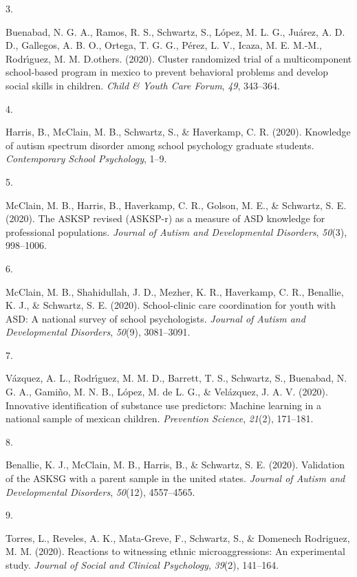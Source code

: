 \documentclass[11pt,a4paper,]{moderncv}
\newlength{\csllabelwidth}
\newcommand{\CSLLeftMargin}[1]{\parbox[t]{\csllabelwidth}{#1}}
\newcommand{\CSLRightInline}[1]{\parbox[t]{\linewidth - \csllabelwidth}{#1}}
\begin{document}
\leavevmode{}%
\CSLLeftMargin{3. }
\CSLRightInline{Buenabad, N. G. A., Ramos, R. S., Schwartz, S., López,
M. L. G., Juárez, A. D. D., Gallegos, A. B. O., Ortega, T. G. G., Pérez,
L. V., Icaza, M. E. M.-M., Rodrı́guez, M. M. D.others. (2020). Cluster
randomized trial of a multicomponent school-based program in mexico to
prevent behavioral problems and develop social skills in children.
\emph{Child \& Youth Care Forum}, \emph{49}, 343--364.}

\leavevmode{}%
\CSLLeftMargin{4. }
\CSLRightInline{Harris, B., McClain, M. B., Schwartz, S., \& Haverkamp,
C. R. (2020). Knowledge of autism spectrum disorder among school
psychology graduate students. \emph{Contemporary School Psychology},
1--9.}

\leavevmode{}%
\CSLLeftMargin{5. }
\CSLRightInline{McClain, M. B., Harris, B., Haverkamp, C. R., Golson, M.
E., \& Schwartz, S. E. (2020). The ASKSP revised (ASKSP-r) as a measure
of ASD knowledge for professional populations. \emph{Journal of Autism
and Developmental Disorders}, \emph{50}(3), 998--1006.}

\leavevmode{}%
\CSLLeftMargin{6. }
\CSLRightInline{McClain, M. B., Shahidullah, J. D., Mezher, K. R.,
Haverkamp, C. R., Benallie, K. J., \& Schwartz, S. E. (2020).
School-clinic care coordination for youth with ASD: A national survey of
school psychologists. \emph{Journal of Autism and Developmental
Disorders}, \emph{50}(9), 3081--3091.}

\leavevmode{}%
\CSLLeftMargin{7. }
\CSLRightInline{Vázquez, A. L., Rodrı́guez, M. M. D., Barrett, T. S.,
Schwartz, S., Buenabad, N. G. A., Gamiño, M. N. B., López, M. de L. G.,
\& Velázquez, J. A. V. (2020). Innovative identification of substance
use predictors: Machine learning in a national sample of mexican
children. \emph{Prevention Science}, \emph{21}(2), 171--181.}

\leavevmode{}%
\CSLLeftMargin{8. }
\CSLRightInline{Benallie, K. J., McClain, M. B., Harris, B., \&
Schwartz, S. E. (2020). Validation of the ASKSG with a parent sample in
the united states. \emph{Journal of Autism and Developmental Disorders},
\emph{50}(12), 4557--4565.}

\leavevmode{}%
\CSLLeftMargin{9. }
\CSLRightInline{Torres, L., Reveles, A. K., Mata-Greve, F., Schwartz,
S., \& Domenech Rodriguez, M. M. (2020). Reactions to witnessing ethnic
microaggressions: An experimental study. \emph{Journal of Social and
Clinical Psychology}, \emph{39}(2), 141--164.}
\end{document}
